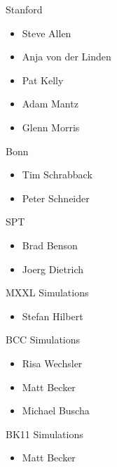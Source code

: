 \documentclass[11pt]{article}
\begin{document}
Stanford
\begin{itemize}
\item Steve Allen
\item Anja von der Linden
\item Pat Kelly
\item Adam Mantz
\item Glenn Morris
\end{itemize}

Bonn
\begin{itemize}
\item Tim Schrabback
\item Peter Schneider
\end{itemize}

SPT
\begin{itemize}
\item Brad Benson
\item Joerg Dietrich
\end{itemize}

MXXL Simulations
\begin{itemize}
\item Stefan Hilbert
\end{itemize}

BCC Simulations
\begin{itemize}
\item Risa Wechsler
\item Matt Becker
\item Michael Buscha
\end{itemize}

BK11 Simulations
\begin{itemize}
\item Matt Becker
\end{itemize}





\end{document}
